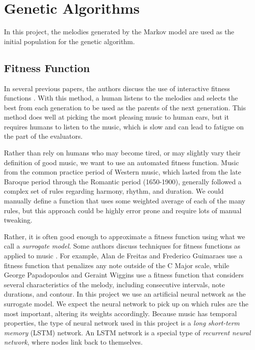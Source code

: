 \chapter{Genetic Algorithms} \label{ga}

In this project, the melodies generated by the Markov model are used as the initial population for the genetic algorithm.

\section{Fitness Function} \label{ga:fitness}

In several previous papers, the authors discuss the use of interactive fitness functions \cite{papadopoulos_ai_1999, mcvicar_autoguitartab:_2015}.
With this method, a human listens to the melodies and selects the best from each generation to be used as the parents of the next generation.
This method does well at picking the most pleasing music to human ears, but it requires humans to listen to the music, which is slow and can lead to fatigue on the part of the evaluators.

Rather than rely on humans who may become tired, or may slightly vary their definition of good music, we want to use an automated fitness function.
Music from the common practice period of Western music, which lasted from the late Baroque period through the Romantic period (1650-1900), generally followed a complex set of rules regarding harmony, rhythm, and duration.
We could manually define a function that uses some weighted average of each of the many rules, but this approach could be highly error prone and require lots of manual tweaking.

Rather, it is often good enough to approximate a fitness function using what we call a \textit{surrogate model}. %
Some authors discuss techniques for fitness functions as applied to music \cite{papadopoulos_ai_1999, de_freitas_originality_2011, alfonseca_fitness_2006}.
For example, Alan de Freitas and Frederico Guimaraes use a fitness function that penalizes any note outside of the C Major scale, while George Papadopoulos and Geraint Wiggins use a fitness function that considers several characteristics of the melody, including consecutive intervals, note durations, and contour.
In this project we use an artificial neural network as the surrogate model.
We expect the neural network to pick up on which rules are the most important, altering its weights accordingly.
Because music has temporal properties, the type of neural network used in this project is a \textit{long short-term memory} (LSTM) network.
An LSTM network is a special type of \textit{recurrent neural network}, where nodes link back to themselves. %

